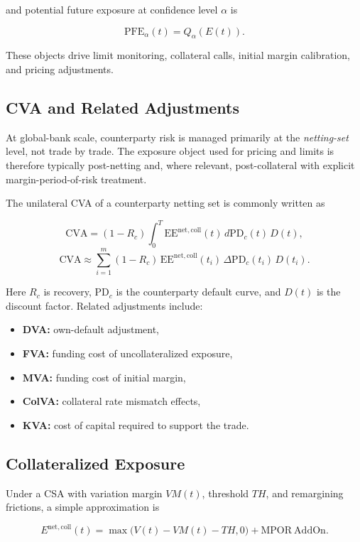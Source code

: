 \documentclass{apex_mdd}
\begin{document}
and potential future exposure at confidence level $\alpha$ is
\begin{formulabox}
\[
  \mathrm{PFE}_{\alpha}(t) = Q_{\alpha}(E(t)).
\]
\end{formulabox}

These objects drive limit monitoring, collateral calls, initial margin calibration, and pricing adjustments.

\subsection{CVA and Related Adjustments}

At global-bank scale, counterparty risk is managed primarily at the \emph{netting-set} level, not trade by trade. The exposure object used for pricing and limits is therefore typically post-netting and, where relevant, post-collateral with explicit margin-period-of-risk treatment.

The unilateral CVA of a counterparty netting set is commonly written as
\begin{formulabox}
\[
  \mathrm{CVA}
  =
  (1-R_c)
  \int_0^T
  \mathrm{EE}^{\mathrm{net,coll}}(t)\,
  d\mathrm{PD}_c(t)\,
  D(t),
\]
\[
  \mathrm{CVA}
  \approx
  \sum_{i=1}^{m}
  (1-R_c)\,
  \mathrm{EE}^{\mathrm{net,coll}}(t_i)\,
  \Delta \mathrm{PD}_c(t_i)\,
  D(t_i).
\]
\end{formulabox}

Here $R_c$ is recovery, $\mathrm{PD}_c$ is the counterparty default curve, and $D(t)$ is the discount factor. Related adjustments include:
\begin{itemize}
  \item \textbf{DVA:} own-default adjustment,
  \item \textbf{FVA:} funding cost of uncollateralized exposure,
  \item \textbf{MVA:} funding cost of initial margin,
  \item \textbf{ColVA:} collateral rate mismatch effects,
  \item \textbf{KVA:} cost of capital required to support the trade.
\end{itemize}

\subsection{Collateralized Exposure}

Under a CSA with variation margin $VM(t)$, threshold $TH$, and remargining frictions, a simple approximation is
\begin{formulabox}
\[
  E^{\mathrm{net,coll}}(t)
  =
  \max\bigl(V(t)-VM(t)-TH,0\bigr) + \mathrm{MPOR\ AddOn}.
\]
\end{formulabox}
\end{document}
